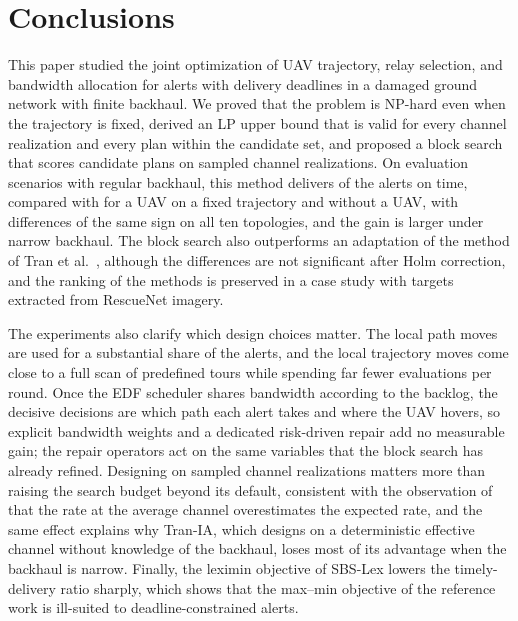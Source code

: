 \section{Conclusions}
\label{sec:discussion}\label{sec:conclusion}

This paper studied the joint optimization of UAV trajectory, relay selection, and bandwidth allocation for alerts with delivery deadlines in a damaged ground network with finite backhaul. We proved that the problem is NP-hard even when the trajectory is fixed, derived an LP upper bound that is valid for every channel realization and every plan within the candidate set, and proposed a block search that scores candidate plans on sampled channel realizations. On \ResultTwoScenarioCount{} evaluation scenarios with regular backhaul, this method delivers \ResultTwoTimelyVzeroBtwo{} of the alerts on time, compared with \ResultTwoTimelyVzeroBone{} for a UAV on a fixed trajectory and \ResultTwoTimelyVzeroBzero{} without a UAV, with differences of the same sign on all ten topologies, and the gain is larger under narrow backhaul. The block search also outperforms an adaptation of the method of Tran et al.~\cite{tran2022relay}, although the differences are not significant after Holm correction, and the ranking of the methods is preserved in a case study with targets extracted from RescueNet imagery.

The experiments also clarify which design choices matter. The local path moves are used for a substantial share of the alerts, and the local trajectory moves come close to a full scan of predefined tours while spending far fewer evaluations per round. Once the EDF scheduler shares bandwidth according to the backlog, the decisive decisions are which path each alert takes and where the UAV hovers, so explicit bandwidth weights and a dedicated risk-driven repair add no measurable gain; the repair operators act on the same variables that the block search has already refined. Designing on sampled channel realizations matters more than raising the search budget beyond its default, consistent with the observation of~\cite{park2026expected} that the rate at the average channel overestimates the expected rate, and the same effect explains why Tran-IA, which designs on a deterministic effective channel without knowledge of the backhaul, loses most of its advantage when the backhaul is narrow. Finally, the leximin objective of SBS-Lex lowers the timely-delivery ratio sharply, which shows that the max--min objective of the reference work is ill-suited to deadline-constrained alerts.

